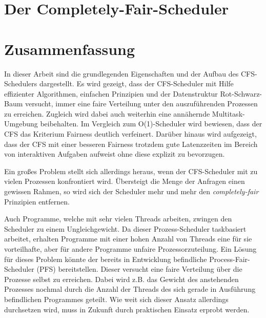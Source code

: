 \documentclass[ngerman]{seminarvorlage}
\begin{document}





\section{Der Completely-Fair-Scheduler}\label{s:cfsmain}





\section{Zusammenfassung}\label{s:end}
In dieser Arbeit sind die grundlegenden Eigenschaften und der Aufbau des CFS-Schedulers dargestellt. Es wird gezeigt, dass der CFS-Scheduler mit Hilfe effizienter Algorithmen, einfachen Prinzipien und der Datenstruktur Rot-Schwarz-Baum versucht, immer eine faire Verteilung unter den auszuführenden Prozessen zu erreichen. Zugleich wird dabei auch weiterhin eine annähernde Multitask-Um\-gebung beibehalten. Im Vergleich zum O(1)-Scheduler wird bewiesen, dass der CFS das Kriterium Fairness deutlich verfeinert. Darüber hinaus wird aufgezeigt, dass der CFS mit einer besseren Fairness trotzdem gute Latenzzeiten im Bereich von interaktiven Aufgaben aufweist ohne diese explizit zu bevorzugen.

Ein großes Problem stellt sich allerdings heraus, wenn der CFS-Scheduler mit zu vielen Prozessen konfrontiert wird. Über\-steigt die Menge der Anfragen einen gewissen Rahmen, so wird sich der Scheduler mehr und mehr den  \textit{com\-pletely-fair} Prinzipien entfernen.  

Auch Programme, welche mit sehr vielen Threads arbeiten, zwingen den Scheduler zu einem Ungleichgewicht. Da dieser Prozess-Scheduler taskbasiert arbeitet, erhalten Programme mit einer hohen Anzahl von Threads eine für sie vorteilhafte, aber für andere Programme unfaire Prozessorzuteilung. Ein Lösung für dieses Problem könnte der bereits in Entwicklung befindliche Process-Fair-Sched\-uler (PFS) bereitstellen. Dieser versucht eine faire Verteilung über die Prozesse selbst zu erreichen. Dabei wird z.B. das Gewicht des anstehenden Prozesses nochmal durch die Anzahl der Threads des sich gerade in Ausführung befindlichen Programmes geteilt. Wie weit sich dieser Ansatz allerdings durchsetzen wird, muss in Zukunft durch praktischen Einsatz erprobt werden.
\end{document}
